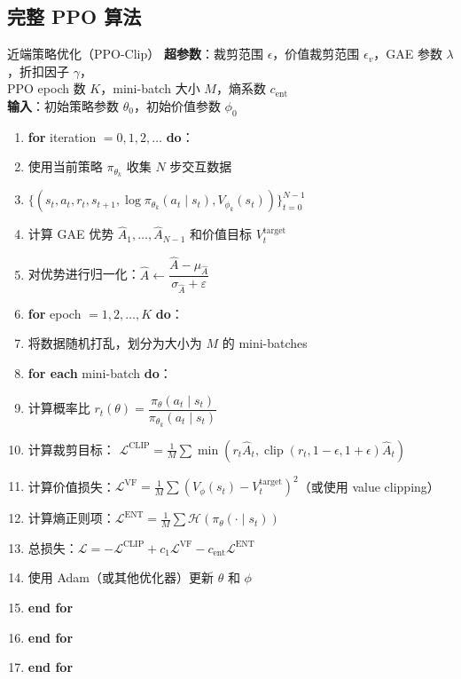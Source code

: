 \subsection{完整 PPO 算法}

\begin{myalgorithm}{近端策略优化（PPO-Clip）}
\textbf{超参数}：裁剪范围 $\epsilon$，价值裁剪范围 $\epsilon_v$，GAE 参数 $\lambda$，折扣因子 $\gamma$，\\
\qquad\qquad PPO epoch 数 $K$，mini-batch 大小 $M$，熵系数 $c_{\text{ent}}$\\
\textbf{输入}：初始策略参数 $\theta_0$，初始价值参数 $\phi_0$
\begin{enumerate}
    \item \textbf{for} iteration $= 0, 1, 2, \dots$ \textbf{do}：
    \item \quad 使用当前策略 $\pi_{\theta_k}$ 收集 $N$ 步交互数据
    \item \quad \quad $\{(s_t, a_t, r_t, s_{t+1}, \log\pi_{\theta_k}(a_t\mid s_t), V_{\phi_k}(s_t))\}_{t=0}^{N-1}$
    \item \quad 计算 GAE 优势 $\hat{A}_1, \dots, \hat{A}_{N-1}$ 和价值目标 $V_t^{\text{target}}$
    \item \quad 对优势进行归一化：$\hat{A} \leftarrow \dfrac{\hat{A} - \mu_{\hat{A}}}{\sigma_{\hat{A}} + \varepsilon}$
    \item \quad \textbf{for} epoch $= 1, 2, \dots, K$ \textbf{do}：
    \item \quad \quad 将数据随机打乱，划分为大小为 $M$ 的 mini-batches
    \item \quad \quad \textbf{for each} mini-batch \textbf{do}：
    \item \quad \quad \quad 计算概率比 $r_t(\theta) = \dfrac{\pi_\theta(a_t \mid s_t)}{\pi_{\theta_k}(a_t \mid s_t)}$
    \item \quad \quad \quad 计算裁剪目标：
    \quad $\mathcal{L}^{\text{CLIP}} = \frac{1}{M} \sum \min(r_t \hat{A}_t, \operatorname{clip}(r_t, 1-\epsilon, 1+\epsilon) \hat{A}_t)$
    \item \quad \quad \quad 计算价值损失：$\mathcal{L}^{\text{VF}} = \frac{1}{M} \sum (V_\phi(s_t) - V_t^{\text{target}})^2$（或使用 value clipping）
    \item \quad \quad \quad 计算熵正则项：$\mathcal{L}^{\text{ENT}} = \frac{1}{M} \sum \mathcal{H}(\pi_\theta(\cdot \mid s_t))$
    \item \quad \quad \quad 总损失：$\mathcal{L} = -\mathcal{L}^{\text{CLIP}} + c_1 \mathcal{L}^{\text{VF}} - c_{\text{ent}} \mathcal{L}^{\text{ENT}}$
    \item \quad \quad \quad 使用 Adam（或其他优化器）更新 $\theta$ 和 $\phi$
    \item \quad \quad \textbf{end for}
    \item \quad \textbf{end for}
    \item \textbf{end for}
\end{enumerate}
\end{myalgorithm}

